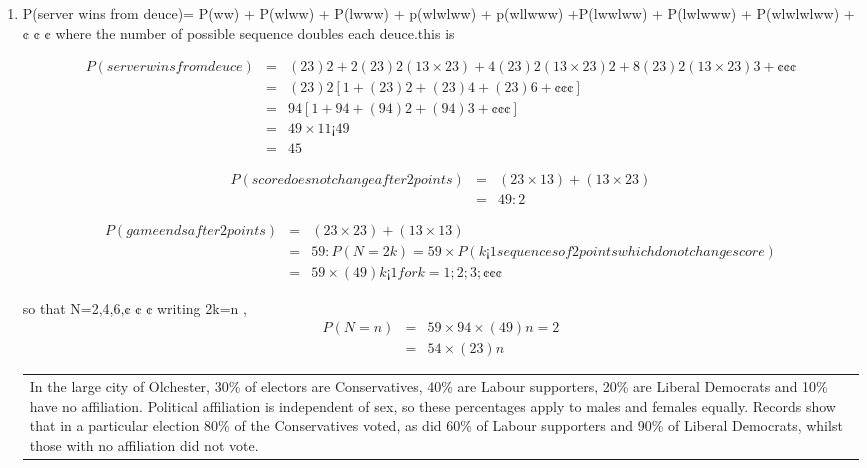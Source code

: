 \documentclass[a4paper,12pt]{article}
\begin{document}
\begin{enumerate}
\begin{table}[ht!]
\begin{tabular}{|p{15cm}|}
\[ P(N=n) = \frac{5}{4}\left\frac{2}{3}\right)^n \]
 
 
 
and state the range of possible values for N. 

 
 
 \\ \hline
      \end{tabular}
    \end{table}
\item P(server wins from deuce)=
P(ww) + P(wlww) + P(lwww) + p(wlwlww) + p(wllwww)
+P(lwwlww) + P(lwlwww) + P(wlwlwlww) + ¢ ¢ ¢
where the number of possible sequence doubles each deuce.this is


\begin{eqnarray*}
P(server wins from deuce) &=& 
( 2
3 )2 + 2(2
3 )2( 1
3 \times  2
3 ) + 4(2
3 )2( 1
3 \times  2
3 )2 + 8(2
3 )2( 1
3 \times  2
3 )3 + ¢ ¢ ¢
\\ &=& ( 2
3 )2[1 + ( 2
3 )2 + ( 2
3 )4 + ( 2
3 )6 + ¢ ¢ ¢]
\\ &=&  9
4 [1 + 9
4 + ( 9
4 )2 + ( 9
4 )3 + ¢ ¢ ¢] \\ &=&  4
9 \times  1
1¡4
9
\\ &=&  4
5
\end{eqnarray*}

\begin{eqnarray*}
P(score does not change after 2 points)  &=&  ( 2
3 \times  1
3 ) + ( 1
3 \times  2
3 ) \\ &=&  4
9 :
2
\end{eqnarray*}

\begin{eqnarray*}
P(game ends after 2 points) &=& ( 2
3 \times  2
3 ) + ( 1
3 \times  1
3 ) \\ &=&  5
9 :
P(N = 2k) = 5
9 \times  P(k ¡ 1 sequences of 2 points which do not change score)
\\ &=&  5
9 \times  ( 4
9 )k¡1 for k = 1; 2; 3; ¢ ¢ ¢
\end{eqnarray*}

so that N=2,4,6,¢ ¢ ¢
writing 2k=n ,
\begin{eqnarray*} P(N = n) &=& 5
9 \times  9
4 \times  ( 4
9 )n=2 \\ &=&  5
4 \times  ( 2
3 )n
\end{eqnarray*}

\newpage    
  \begin{table}[ht!]
     \centering
     \begin{tabular}{|p{15cm}|}
     \hline  
In the large city of Olchester, 30\% of electors are Conservatives, 40\% are Labour supporters, 20\% are Liberal Democrats and 10\% have no affiliation.  Political affiliation is independent of sex, so these percentages apply to males and females equally.  Records show that in a particular election 80\% of the Conservatives voted, as did 60\% of Labour supporters and 90\% of Liberal Democrats, whilst those with no affiliation did not vote.  


\end{tabular}
\end{table}
\end{enumerate}
\end{document}
